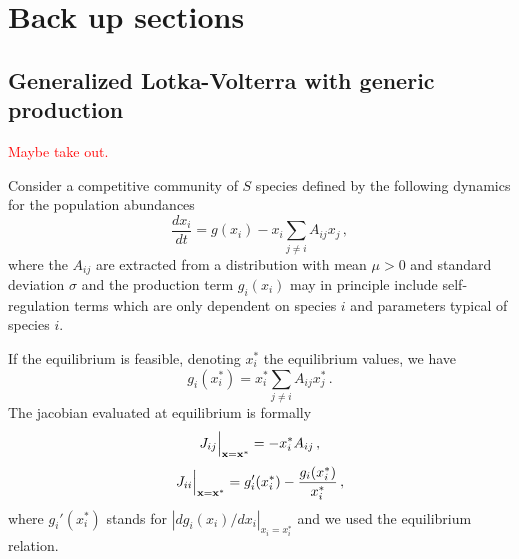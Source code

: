 \documentclass[10pt]{article}
\begin{document}
\newpage

\section{Back up sections}

\subsection{Generalized Lotka-Volterra with generic production}
\textcolor{red}{Maybe take out.}

Consider a competitive community of $S$ species
defined by the following dynamics for the population abundances
\begin{equation}
    \frac{dx_i}{dt}=g(x_i)-x_i\sum_{j\neq i}A_{ij}x_j \, ,
\end{equation}
where the $A_{ij}$ are extracted from a distribution
with mean $\mu>0$ and standard deviation $\sigma$ and
the production term $g_i(x_i)$ may in principle include
self-regulation terms which are only dependent on species $i$
and parameters typical of species $i$.

If the equilibrium is feasible, denoting $x_i^*$ the equilibrium values,
we have
\begin{equation}
    g_i(x_i^*)=x_i^*\sum_{j\neq i}A_{ij}x_j^* \, .
\end{equation}
The jacobian evaluated at equilibrium is formally
\begin{equation}
    J_{ij}\Big{|}_{\bf{x}=\bf{x}^*} = -x_i^*A_{ij} \, ,
\end{equation}
\begin{equation}
    J_{ii}\Big{|}_{\bf{x}=\bf{x}^*} =  g_i'(x_i^*)-\frac{g_i(x_i^*)}{x_i^*}\, ,
\end{equation}
where $g_i'(x_i^*)$ stands for $|d g_i(x_i)/d x_i|_{x_i=x_i^*}$ 
and we used the equilibrium relation.
\end{document}

